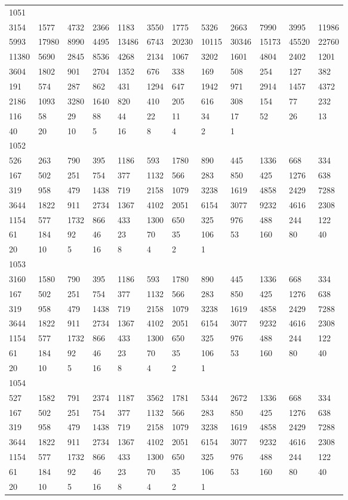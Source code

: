 \begin{longtable}{llllllllllll}
1051&&&&&&&&&&&\\
3154& 1577& 4732& 2366& 1183& 3550& 1775& 5326& 2663& 7990& 3995& 11986\\
5993& 17980& 8990& 4495& 13486& 6743& 20230& 10115& 30346& 15173& 45520& 22760\\
11380& 5690& 2845& 8536& 4268& 2134& 1067& 3202& 1601& 4804& 2402& 1201\\
3604& 1802& 901& 2704& 1352& 676& 338& 169& 508& 254& 127& 382\\
191& 574& 287& 862& 431& 1294& 647& 1942& 971& 2914& 1457& 4372\\
2186& 1093& 3280& 1640& 820& 410& 205& 616& 308& 154& 77& 232\\
116& 58& 29& 88& 44& 22& 11& 34& 17& 52& 26& 13\\
40& 20& 10& 5& 16& 8& 4& 2& 1& \\

1052&&&&&&&&&&&\\
526& 263& 790& 395& 1186& 593& 1780& 890& 445& 1336& 668& 334\\
167& 502& 251& 754& 377& 1132& 566& 283& 850& 425& 1276& 638\\
319& 958& 479& 1438& 719& 2158& 1079& 3238& 1619& 4858& 2429& 7288\\
3644& 1822& 911& 2734& 1367& 4102& 2051& 6154& 3077& 9232& 4616& 2308\\
1154& 577& 1732& 866& 433& 1300& 650& 325& 976& 488& 244& 122\\
61& 184& 92& 46& 23& 70& 35& 106& 53& 160& 80& 40\\
20& 10& 5& 16& 8& 4& 2& 1& \\

1053&&&&&&&&&&&\\
3160& 1580& 790& 395& 1186& 593& 1780& 890& 445& 1336& 668& 334\\
167& 502& 251& 754& 377& 1132& 566& 283& 850& 425& 1276& 638\\
319& 958& 479& 1438& 719& 2158& 1079& 3238& 1619& 4858& 2429& 7288\\
3644& 1822& 911& 2734& 1367& 4102& 2051& 6154& 3077& 9232& 4616& 2308\\
1154& 577& 1732& 866& 433& 1300& 650& 325& 976& 488& 244& 122\\
61& 184& 92& 46& 23& 70& 35& 106& 53& 160& 80& 40\\
20& 10& 5& 16& 8& 4& 2& 1& \\

1054&&&&&&&&&&&\\
527& 1582& 791& 2374& 1187& 3562& 1781& 5344& 2672& 1336& 668& 334\\
167& 502& 251& 754& 377& 1132& 566& 283& 850& 425& 1276& 638\\
319& 958& 479& 1438& 719& 2158& 1079& 3238& 1619& 4858& 2429& 7288\\
3644& 1822& 911& 2734& 1367& 4102& 2051& 6154& 3077& 9232& 4616& 2308\\
1154& 577& 1732& 866& 433& 1300& 650& 325& 976& 488& 244& 122\\
61& 184& 92& 46& 23& 70& 35& 106& 53& 160& 80& 40\\
20& 10& 5& 16& 8& 4& 2& 1& \\


\end{longtable}
